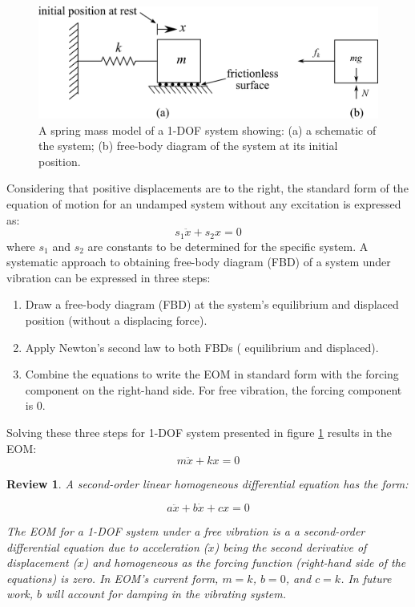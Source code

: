 \documentclass[12pt,letter]{article}
\numberwithin{ex}{section} %
\newtheorem{re}{Review}
\numberwithin{re}{section} %
\newenvironment{review}{\begin{mdframed}[middlelinewidth=2mm,roundcorner=20pt]\begin{re}\normalfont}{\end{re}\end{mdframed}}
\numberwithin{equation}{section}	%
\begin{document}
		\begin{figure}[H]
			\centering
			\includegraphics[]{../figures/EOM_1-DOF-mass_horizontal.png}
			\caption{A spring mass model of a 1-DOF system showing: (a) a schematic of the system; (b)  free-body diagram of the system at its initial position.}
			\label{fig:EOM_1-DOF-mass_horizontal}
		\end{figure}			
		
		Considering that positive displacements are to the right, the standard form of the equation of motion for an undamped system without any excitation is expressed as:  
		\begin{equation}
			s_1 \ddot{x} + s_2 x = 0
		\end{equation}			
		where $s_1$ and $s_2$ are constants to be determined for the specific system. A systematic approach to obtaining free-body diagram (FBD) of a system under vibration can be expressed in three steps:
		\begin{enumerate}
			\item Draw a free-body diagram (FBD) at the system's equilibrium and displaced position (without a displacing force).
			\item Apply Newton's second law to both FBDs ( equilibrium and displaced).
			\item Combine the equations to write the EOM in standard form with the forcing component on the right-hand side. For free vibration, the forcing component is 0. 
		\end{enumerate}
			
		Solving these three steps for 1-DOF system presented in figure \ref{fig:EOM_1-DOF-mass_horizontal} results in the EOM:
		\begin{equation}
			m \ddot{x} + k x = 0
		\end{equation}

		\begin{review}
			A second-order linear homogeneous differential equation has the form:
			
			\begin{equation}
			 a \ddot{x} + b \dot{x} + cx = 0
			\end{equation}
		
			\noindent The EOM for a 1-DOF system under a free vibration is a a second-order differential equation due to acceleration ($\ddot{x}$) being the second derivative of displacement ($x$) and homogeneous as the forcing function (right-hand side of the equations) is zero. In EOM's current form, $m=k$, $b=0$,  and $c=k$. In future work, $b$ will account for damping in the vibrating system.     
		\end{review}
\end{document}
